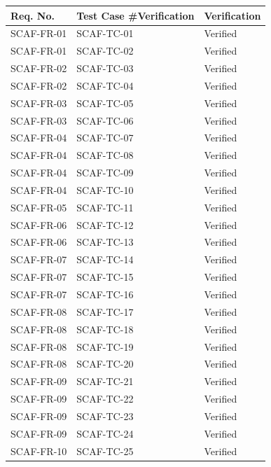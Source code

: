 \documentclass{report}
\begin{document}
\begin{tabularx}{\textwidth}{ 
  |p{}%
  |p{}%
  |p{}|%
}
  \hline
  Req. No. & Test Case \#Verification & Verification \\
  \hline
  SCAF-FR-01 & SCAF-TC-01 & Verified \\
  \hline
  SCAF-FR-01 & SCAF-TC-02 & Verified \\
  \hline
  SCAF-FR-02 & SCAF-TC-03 & Verified \\
  \hline
  SCAF-FR-02 & SCAF-TC-04 & Verified \\
  \hline
  SCAF-FR-03 & SCAF-TC-05 & Verified \\
  \hline
  SCAF-FR-03 & SCAF-TC-06 & Verified \\
  \hline
  SCAF-FR-04 & SCAF-TC-07 & Verified \\
  \hline
  SCAF-FR-04 & SCAF-TC-08 & Verified \\
  \hline
  SCAF-FR-04 & SCAF-TC-09 & Verified \\
  \hline
  SCAF-FR-04 & SCAF-TC-10 & Verified \\
  \hline
  SCAF-FR-05 & SCAF-TC-11 & Verified \\
  \hline
  SCAF-FR-06 & SCAF-TC-12 & Verified \\
  \hline
  SCAF-FR-06 & SCAF-TC-13 & Verified \\
  \hline
  SCAF-FR-07 & SCAF-TC-14 & Verified \\
  \hline
  SCAF-FR-07 & SCAF-TC-15 & Verified \\
  \hline
  SCAF-FR-07 & SCAF-TC-16 & Verified \\
  \hline
  SCAF-FR-08 & SCAF-TC-17 & Verified \\
  \hline
  SCAF-FR-08 & SCAF-TC-18 & Verified \\
  \hline
  SCAF-FR-08 & SCAF-TC-19 & Verified \\
  \hline
  SCAF-FR-08 & SCAF-TC-20 & Verified \\
  \hline
  SCAF-FR-09 & SCAF-TC-21 & Verified \\
  \hline
  SCAF-FR-09 & SCAF-TC-22 & Verified \\
  \hline
  SCAF-FR-09 & SCAF-TC-23 & Verified \\
  \hline
  SCAF-FR-09 & SCAF-TC-24 & Verified \\
  \hline
  SCAF-FR-10 & SCAF-TC-25 & Verified \\
  \hline

\end{tabularx}
\end{document}
